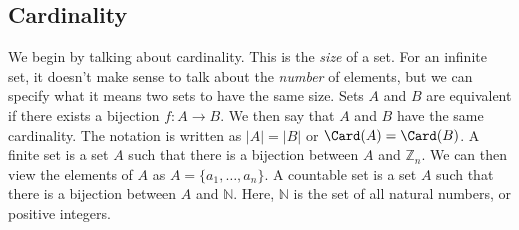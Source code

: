 \documentclass[crop=false,class=book,oneside]{standalone}
\begin{document}
        \subsection{Cardinality}
            We begin by talking about cardinality. This is the
            \textit{size} of a set. For an infinite set, it
            doesn't make sense to talk about the \textit{number}
            of elements, but we can specify what it means two sets
            to have the same size. Sets $A$ and $B$ are equivalent
            if there exists a bijection $f:A\rightarrow{B}$.
            We then say that $A$ and $B$ have the same cardinality.
            The notation is written as $|A|=|B|$ or
            $\Card(A)=\Card(B)$. A finite set is a set $A$ such that
            there is a bijection between $A$ and $\mathbb{Z}_{n}$.
            We can then view the elements of $A$ as
            $A=\{a_{1},\hdots,a_{n}\}$. A countable set is a set
            $A$ such that there is a bijection between $A$ and
            $\mathbb{N}$. Here, $\mathbb{N}$ is the set of all
            natural numbers, or positive integers.
\end{document}
